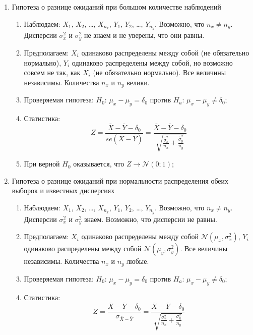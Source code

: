 \documentclass[12pt, a4paper]{article}
\def \cN{\mathcal{N}}
\begin{document}
\begin{enumerate}[resume]
  \item Гипотеза о разнице ожиданий при большом количестве наблюдений
    \begin{enumerate}
      \item Наблюдаем: $X_1$, $X_2$, \ldots, $X_{n_x}$, $Y_1$, $Y_2$, \ldots, $Y_{n_y}$.
	Возможно, что $n_x \neq n_y$. Дисперсии $\sigma^2_x$ и $\sigma^2_y$ не знаем и не уверены, что они равны.
      \item Предполагаем: $X_i$ одинаково распределены между собой (не обязательно нормально),
	$Y_i$ одинаково распределены между собой, но возможно совсем не так, как $X_i$ (не обязательно нормально).
	Все величины независимы. Количества $n_x$ и $n_y$ велики.
      \item Проверяемая гипотеза: $H_0$: $\mu_x - \mu_y = \delta_0$ против $H_a$: $\mu_x - \mu_y \neq \delta_0$;

     \item Статистика:
	\[
	  Z = \frac{\bar X - \bar Y - \delta_0}{se(\bar X - \bar Y)} =
	  \frac{\bar X - \bar Y - \delta_0}{\sqrt{\frac{\hat \sigma^2_x}{n_x}+\frac{\hat\sigma^2_y}{n_y}}}
      \]

    \item При верной $H_0$ оказывается, что $Z \to \cN(0;1)$;
\end{enumerate}

  \item Гипотеза о разнице ожиданий при нормальности распределения обеих выборок и известных дисперсиях
    \begin{enumerate}
      \item Наблюдаем: $X_1$, $X_2$, \ldots, $X_{n_x}$, $Y_1$, $Y_2$, \ldots, $Y_{n_y}$.
	Возможно, что $n_x \neq n_y$. Дисперсии $\sigma^2_x$ и $\sigma^2_y$ знаем. Возможно, что дисперсии не равны.
      \item Предполагаем: $X_i$ одинаково распределены между собой $\cN(\mu_x, \sigma^2_x)$,
	$Y_i$ одинаково распределены между собой $\cN(\mu_y, \sigma^2_y)$.
	Все величины независимы. Количества $n_x$ и $n_y$ любые.
      \item Проверяемая гипотеза: $H_0$: $\mu_x - \mu_y = \delta_0$ против $H_a$: $\mu_x - \mu_y \neq \delta_0$;

     \item Статистика:
	\[
	  Z = \frac{\bar X - \bar Y - \delta_0}{\sigma_{\bar X - \bar Y}} =
	  \frac{\bar X - \bar Y - \delta_0}{\sqrt{\frac{\sigma^2_x}{n_x}+\frac{\sigma^2_y}{n_y}}}
      \]


\end{enumerate}
\end{enumerate}
\end{document}
